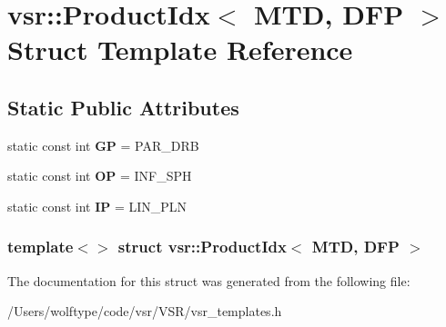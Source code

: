 \hypertarget{structvsr_1_1_product_idx_3_01_m_t_d_00_01_d_f_p_01_4}{\section{vsr\-:\-:Product\-Idx$<$ M\-T\-D, D\-F\-P $>$ Struct Template Reference}
\label{structvsr_1_1_product_idx_3_01_m_t_d_00_01_d_f_p_01_4}
}
\subsection*{Static Public Attributes}
\begin{DoxyCompactItemize}
\item 
\hypertarget{structvsr_1_1_product_idx_3_01_m_t_d_00_01_d_f_p_01_4_aa619dd62c6d49382d1610e82987592ce}{static const int {\bfseries G\-P} = P\-A\-R\-\_\-\-D\-R\-B}\label{structvsr_1_1_product_idx_3_01_m_t_d_00_01_d_f_p_01_4_aa619dd62c6d49382d1610e82987592ce}

\item 
\hypertarget{structvsr_1_1_product_idx_3_01_m_t_d_00_01_d_f_p_01_4_a86e0d626a57c1974b59562d86279af95}{static const int {\bfseries O\-P} = I\-N\-F\-\_\-\-S\-P\-H}\label{structvsr_1_1_product_idx_3_01_m_t_d_00_01_d_f_p_01_4_a86e0d626a57c1974b59562d86279af95}

\item 
\hypertarget{structvsr_1_1_product_idx_3_01_m_t_d_00_01_d_f_p_01_4_ab8767aebe44482d4ae1eecc7cecb0139}{static const int {\bfseries I\-P} = L\-I\-N\-\_\-\-P\-L\-N}\label{structvsr_1_1_product_idx_3_01_m_t_d_00_01_d_f_p_01_4_ab8767aebe44482d4ae1eecc7cecb0139}

\end{DoxyCompactItemize}
\subsubsection*{template$<$$>$ struct vsr\-::\-Product\-Idx$<$ M\-T\-D, D\-F\-P $>$}



The documentation for this struct was generated from the following file\-:\begin{DoxyCompactItemize}
\item 
/\-Users/wolftype/code/vsr/\-V\-S\-R/vsr\-\_\-templates.\-h\end{DoxyCompactItemize}
